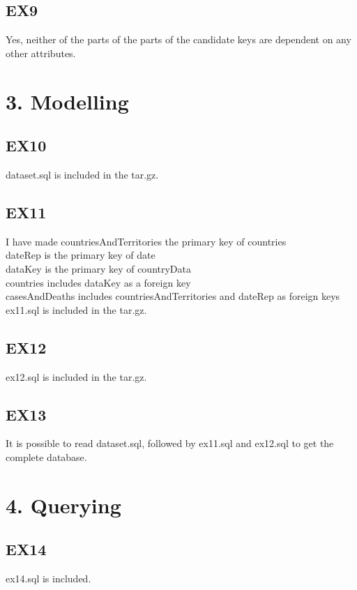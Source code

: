 \documentclass{article}
\begin{document}
\subsection{EX9}
Yes, neither of the parts of the parts of the candidate keys are dependent on any other attributes.

\section{3. Modelling}
\subsection{EX10}
dataset.sql is included in the tar.gz.\\

\subsection{EX11}
I have made countriesAndTerritories the primary key of countries\\
dateRep is the primary key of date\\
dataKey is the primary key of countryData\\
countries includes dataKey as a foreign key\\
casesAndDeaths includes countriesAndTerritories and dateRep as foreign keys\\
ex11.sql is included in the tar.gz.\\

\subsection{EX12}
ex12.sql is included in the tar.gz.\\

\subsection{EX13}
It is possible to read dataset.sql, followed by ex11.sql and ex12.sql to get the complete database.\\

\section{4. Querying}
\subsection{EX14}
ex14.sql is included.\\
\end{document}
